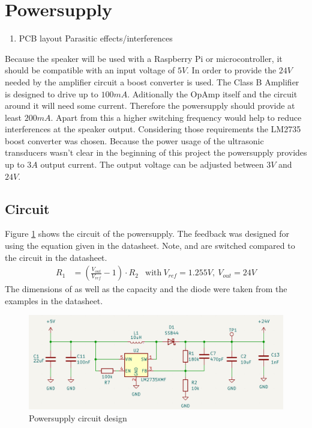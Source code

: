 \section{Powersupply}

\begin{enumerate}
  \item PCB layout
  \subitem Parasitic effects/interferences
\end{enumerate}

Because the speaker will be used with a Raspberry Pi or microcontroller, it should be compatible with an input voltage of $5V$. In order to provide the $24V$ needed by the amplifier circuit a boost converter is used.\p
The Class B Amplifier is designed to drive up to $100mA$. Aditionally the OpAmp itself and the circuit around it will need some current. Therefore the powersupply should provide at least $200mA$. Apart from this a higher switching frequency would help to reduce interferences at the speaker output.\p
%
Considering those requirements the LM2735 boost converter was chosen. Because the power usage of the ultrasonic transducers wasn't clear in the beginning of this project the powersupply provides up to $3A$ output current. The output voltage can be adjusted between $3V$ and $24V$.

\subsection{Circuit}

Figure \ref{fig:pcb:power_circuit} shows the circuit of the powersupply. The feedback was designed for using the equation given in the datasheet.
Note,  and  are switched compared to the circuit in the datasheet.
%
\begin{align}
  R_1 &= \left(\frac{V_{out}}{V_{ref}} - 1\right) \cdot R_2
  &\mathrm{with~} V_{ref} = 1.255V,~V_{out} = 24V
\end{align}
%
The dimensions of  as well as the capacity  and the diode  were taken from the examples in the datasheet.
%
\begin{figure}
  \centering
  \includegraphics[width=\textwidth]{src/assets/pictures/circuit/powersupply_circuit.png}
  \caption{Powersupply circuit design}\label{fig:pcb:power_circuit}
\end{figure}